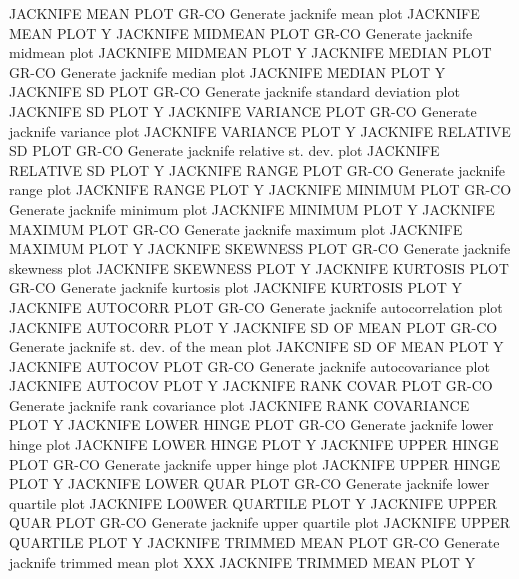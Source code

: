 JACKNIFE MEAN PLOT          GR-CO Generate jacknife mean plot
                                  JACKNIFE MEAN PLOT Y
JACKNIFE MIDMEAN PLOT       GR-CO Generate jacknife midmean plot
                                  JACKNIFE MIDMEAN PLOT Y
JACKNIFE MEDIAN PLOT        GR-CO Generate jacknife median plot
                                  JACKNIFE MEDIAN PLOT Y
JACKNIFE SD PLOT            GR-CO Generate jacknife standard deviation plot
                                  JACKNIFE SD PLOT Y
JACKNIFE VARIANCE PLOT      GR-CO Generate jacknife variance plot
                                  JACKNIFE VARIANCE PLOT Y
JACKNIFE RELATIVE SD PLOT   GR-CO Generate jacknife relative st. dev. plot
                                  JACKNIFE RELATIVE SD PLOT Y
JACKNIFE RANGE PLOT         GR-CO Generate jacknife range plot
                                  JACKNIFE RANGE PLOT Y
JACKNIFE MINIMUM PLOT       GR-CO Generate jacknife minimum plot
                                  JACKNIFE MINIMUM PLOT Y
JACKNIFE MAXIMUM PLOT       GR-CO Generate jacknife maximum plot
                                  JACKNIFE MAXIMUM PLOT Y
JACKNIFE SKEWNESS PLOT      GR-CO Generate jacknife skewness plot
                                  JACKNIFE SKEWNESS PLOT Y
JACKNIFE KURTOSIS PLOT      GR-CO Generate jacknife kurtosis plot
                                  JACKNIFE KURTOSIS PLOT Y
JACKNIFE AUTOCORR PLOT      GR-CO Generate jacknife autocorrelation plot
                                  JACKNIFE AUTOCORR PLOT Y
JACKNIFE SD OF MEAN PLOT    GR-CO Generate jacknife st. dev. of the mean plot
                                  JAKCNIFE SD OF MEAN PLOT Y
JACKNIFE AUTOCOV PLOT       GR-CO Generate jacknife autocovariance plot
                                  JACKNIFE AUTOCOV PLOT Y
JACKNIFE RANK COVAR PLOT    GR-CO Generate jacknife rank covariance plot
                                  JACKNIFE RANK COVARIANCE PLOT Y
JACKNIFE LOWER HINGE PLOT   GR-CO Generate jacknife lower hinge plot
                                  JACKNIFE LOWER HINGE PLOT Y
JACKNIFE UPPER HINGE PLOT   GR-CO Generate jacknife upper hinge plot
                                  JACKNIFE UPPER HINGE PLOT Y
JACKNIFE LOWER QUAR PLOT    GR-CO Generate jacknife lower quartile plot
                                  JACKNIFE LO0WER QUARTILE PLOT Y
JACKNIFE UPPER QUAR PLOT    GR-CO Generate jacknife upper quartile plot
                                  JACKNIFE UPPER QUARTILE PLOT Y
JACKNIFE TRIMMED MEAN PLOT  GR-CO Generate jacknife trimmed mean plot
                                  XXX
                                  JACKNIFE TRIMMED MEAN PLOT Y
